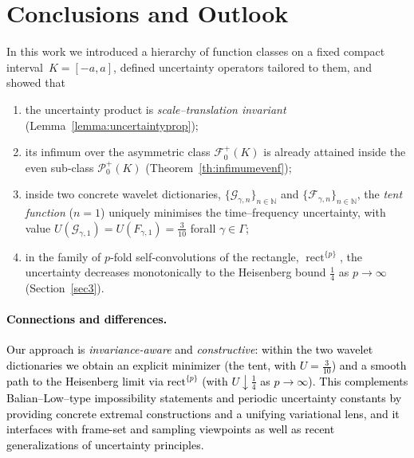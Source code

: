 \documentclass[preprint,hidelinks,authoryear]{elsarticle}
\theoremstyle{plain}
\theoremstyle{definition}
\theoremstyle{remark}
\begin{document}
\section{Conclusions and Outlook}\label{sec:conclusions}

In this work we introduced a hierarchy of function classes on a fixed compact
interval~$K=[-a,a]$, defined uncertainty operators tailored to them, and
showed that
\begin{enumerate}[label=(\roman*)]
  \item the uncertainty product is \emph{scale--translation invariant}
        (Lemma~\ref{lemma:uncertaintyprop});
  \item its infimum over the asymmetric class $\mathcal{F}^+_{0}(K)$ is already
        attained inside the even sub‑class $\mathcal{P}^+_{0}(K)$
        (Theorem~\ref{th:infimumevenf});
  \item inside two concrete wavelet dictionaries,
        $\{\mathcal G_{\gamma,n}\}_{n\in\mathbb N}$ and
        $\{\mathcal F_{\gamma,n}\}_{n\in\mathbb N}$,
        the \emph{tent function} ($n=1$) uniquely minimises the
        time–frequency uncertainty, with value $U(\mathcal G_{\gamma,1})=U(F_{\gamma,1})=\tfrac{3}{10}$ forall $\gamma \in \Gamma$;
  \item in the family of $p$‑fold self‑convolutions of the rectangle,
        $\operatorname{rect}^{\{p\}}$, the uncertainty decreases
        monotonically to the Heisenberg bound $\tfrac14$ as
        $p\to\infty$ (Section~\ref{sec3}).
\end{enumerate}


\textcolor{black}{\paragraph{Connections and differences.}
Our approach is \emph{invariance-aware} and \emph{constructive}: within the two wavelet dictionaries
we obtain an explicit minimizer (the tent, with $U=\tfrac{3}{10}$) and a smooth path to the
Heisenberg limit via $\mathrm{rect}^{\{p\}}$ (with $U\downarrow\tfrac{1}{4}$ as $p\to\infty$).
This complements Balian–Low–type impossibility statements and periodic uncertainty constants by providing
concrete extremal constructions and a unifying variational lens, and it interfaces with frame-set and
sampling viewpoints as well as recent generalizations of uncertainty principles.
}
\end{document}
